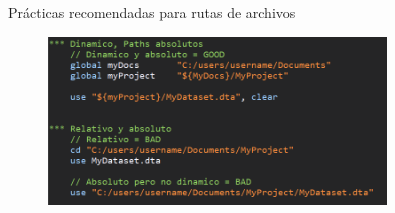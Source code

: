 \documentclass[11pt, aspectratio=169, compress]{beamer}
\begin{document}
\begin{frame}{Prácticas recomendadas para rutas de archivos}
	\begin{figure}[H]
		\centering
		\includegraphics[width=0.8\textwidth]{paths.png}
	\end{figure}	
\end{frame}
\end{document}
